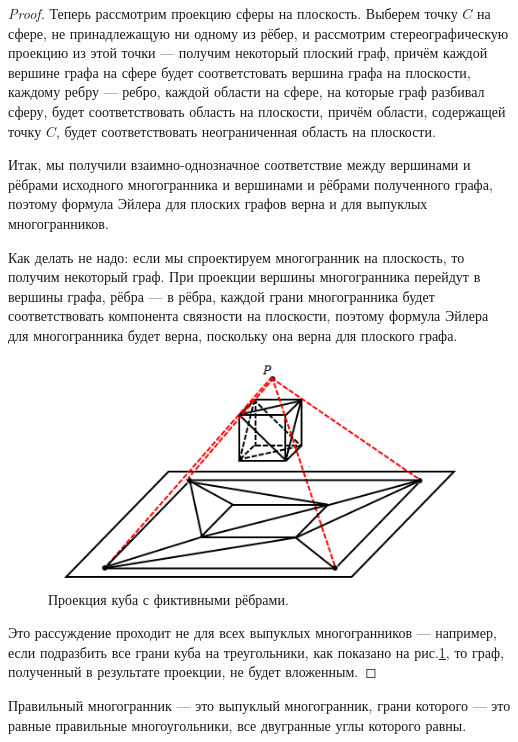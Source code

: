 \begin{proof}
    Теперь рассмотрим проекцию сферы на плоскость. Выберем точку $C$ на сфере, не принадлежащую ни одному из рёбер, и рассмотрим стереографическую проекцию из этой точки — получим некоторый плоский граф, причём каждой вершине графа на сфере будет соответстовать вершина графа на плоскости, каждому ребру — ребро, каждой области на сфере, на которые граф разбивал сферу, будет соответствовать область на плоскости, причём области, содержащей точку $C$, будет соответствовать неограниченная область на плоскости.

    Итак, мы получили взаимно-однозначное соответствие между вершинами и рёбрами исходного многогранника и вершинами и рёбрами полученного графа, поэтому формула Эйлера для плоских графов верна и для выпуклых многогранников.

    Как делать не надо: если мы спроектируем многогранник на плоскость, то получим некоторый граф. При проекции вершины многогранника перейдут в вершины графа, рёбра — в рёбра, каждой грани многогранника будет соответствовать компонента связности на плоскости, поэтому формула Эйлера для многогранника будет верна, поскольку она верна для плоского графа.

    \begin{figure}[h]
        \centering
        \includegraphics[scale=0.8]{images/c7.1.png}
        \caption{Проекция куба с фиктивными рёбрами.}
        \label{fig:c7.1}
    \end{figure}

    Это рассуждение проходит не для всех выпуклых многогранников — например, если подразбить все грани куба на треугольники, как показано на рис.\ref{fig:c7.1}, то граф, полученный в результате проекции, не будет вложенным.
\end{proof}

\begin{definition}
    Правильный многогранник — это выпуклый многогранник, грани которого — это равные правильные многоугольники, все двугранные углы которого равны.
\end{definition}

